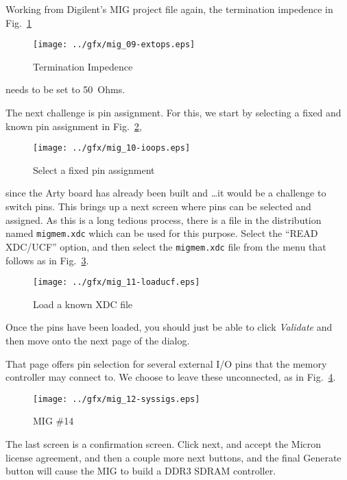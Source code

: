 \documentclass{gqtekspec}
\begin{document}
Working from Digilent's MIG project file again, the termination impedence in
Fig.~\ref{fig:mig_extops}
\begin{figure}\begin{center}
\texttt{[image: ../gfx/mig\_09-extops.eps]}
\caption{Termination Impedence}\label{fig:mig_extops}
\end{center}\end{figure}
needs to be set to 50~Ohms.

The next challenge is pin assignment.  For this, we start by selecting a fixed
and known pin assignment in Fig.~\ref{fig:mig_ioops},
\begin{figure}\begin{center}
\texttt{[image: ../gfx/mig\_10-ioops.eps]}
\caption{Select a fixed pin assignment}\label{fig:mig_ioops}
\end{center}\end{figure}
since the Arty board has already been built and \ldots it would be a challenge
to switch pins.  This brings up a next screen where pins can be selected and
assigned.  As this is a long tedious process, there is a file in the
distribution named {\tt migmem.xdc} which can be used for this purpose.
Select the ``READ XDC/UCF'' option, and then select the {\tt migmem.xdc}
file from the menu that follows as in Fig.~\ref{fig:mig_loaducf}.
\begin{figure}\begin{center}
\texttt{[image: ../gfx/mig\_11-loaducf.eps]}
\caption{Load a known XDC file}\label{fig:mig_loaducf}
\end{center}\end{figure}
Once the pins have been loaded, you should just be able to click {\em Validate}
and then move onto the next page of the dialog.

That page offers pin selection for several external I/O pins that the memory
controller may connect to.  We choose to leave these unconnected, as in 
Fig.~\ref{fig:mig_syssigs}.
\begin{figure}\begin{center}
\texttt{[image: ../gfx/mig\_12-syssigs.eps]}
\caption{MIG \#14}\label{fig:mig_syssigs}
\end{center}\end{figure}

The last screen is a confirmation screen.  Click next, and accept the Micron
license agreement, and then a couple more next buttons, and the final Generate
button will cause the MIG to build a DDR3 SDRAM controller.
\end{document}
